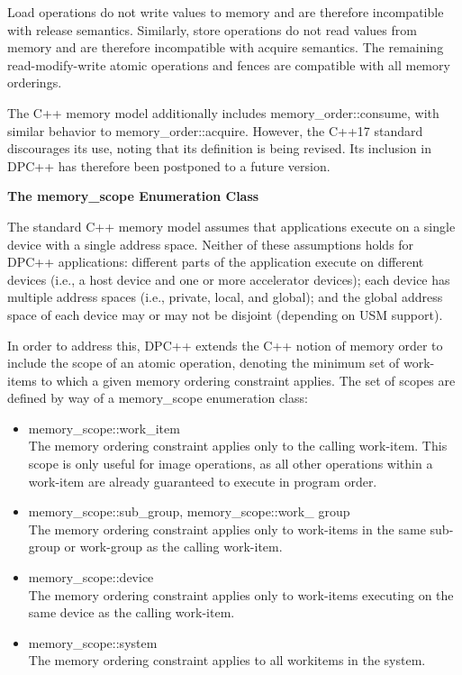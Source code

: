 Load operations do not write values to memory and are therefore incompatible with release semantics. Similarly, store operations do not read values from memory and are therefore incompatible with acquire semantics. The remaining read-modify-write atomic operations and fences are compatible with all memory orderings.\par

\begin{tcolorbox}[colback=blue!5!white,colframe=blue!75!black, title=MEMORY ORDER IN C++]
The C++ memory model additionally includes memory\_order::consume, with similar behavior to memory\_order::acquire. However, the C++17 standard discourages its use, noting that its definition is being revised. Its inclusion in DPC++ has therefore been postponed to a future version.
\end{tcolorbox}

\hspace*{\fill} \par %
\textbf{The memory\_scope Enumeration Class}

The standard C++ memory model assumes that applications execute on a single device with a single address space. Neither of these assumptions holds for DPC++ applications: different parts of the application execute on different devices (i.e., a host device and one or more accelerator devices); each device has multiple address spaces (i.e., private, local, and global); and the global address space of each device may or may not be disjoint (depending on USM support).\par

In order to address this, DPC++ extends the C++ notion of memory order to include the scope of an atomic operation, denoting the minimum set of work-items to which a given memory ordering constraint applies. The set of scopes are defined by way of a memory\_scope enumeration class:\par

\begin{itemize}
	\item memory\_scope::work\_item \\
	The memory ordering constraint applies only to the calling work-item. This scope is only useful for image operations, as all other operations within a work-item are already guaranteed to execute in program order.
	\item memory\_scope::sub\_group, memory\_scope::work\_
	group \\
	The memory ordering constraint applies only to work-items in the same sub-group or work-group as the calling work-item.
	\item memory\_scope::device \\ 
	The memory ordering constraint applies only to work-items executing on the same device as the calling work-item.
	\item memory\_scope::system \\
	The memory ordering constraint applies to all workitems in the system.
\end{itemize}

